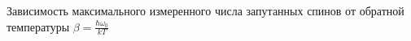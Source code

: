 Зависимость максимального измеренного числа запутанных спинов от обратной температуры
$\beta = \frac{\hbar\omega_0}{kT} $